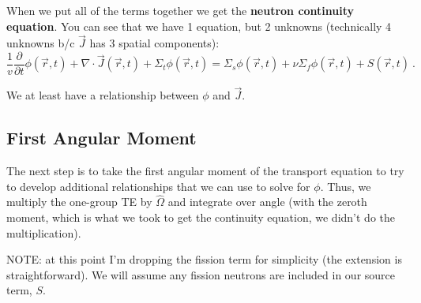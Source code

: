 \documentclass[12pt]{article}
\newlength{\up}
\newcommand{\vOmega}{\ensuremath{\hat{\Omega}}}
\begin{document}
\vspace*{2em}
When we put all of the terms together we get the \textbf{neutron continuity equation}. You can see that we have 1 equation, but 2 unknowns (technically 4 unknowns b/c $\vec{J}$ has 3 spatial components):
\begin{equation}
\frac{1}{v}\frac{\partial}{\partial t}\phi(\vec{r}, t) + 
\nabla \cdot \vec{J}(\vec{r}, t) + 
\Sigma_t \phi(\vec{r}, t) =
\Sigma_s \phi(\vec{r}, t) +
\nu \Sigma_f \phi(\vec{r}, t) +
S(\vec{r}, t)\:.
\label{eq:neutroncont}
\end{equation}

We at least have a relationship between $\phi$ and $\vec{J}$.

\subsection*{First Angular Moment}

The next step is to take the first angular moment of the transport equation to try to develop additional relationships that we can use to solve for $\phi$. Thus, we multiply the one-group TE by $\vOmega$ and integrate over angle (with the zeroth moment, which is what we took to get the continuity equation, we didn't do the multiplication). 

NOTE: at this point I'm dropping the fission term for simplicity (the extension is straightforward). We will assume any fission neutrons are included in our source term, $S$. 
\end{document}
